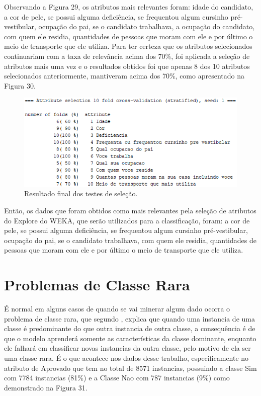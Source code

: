 \par
Observando a Figura 29,  os atributos mais relevantes foram: idade do candidato, a cor de pele, se possui alguma deficiência, se frequentou algum cursinho pré-vestibular, ocupação do pai, se o candidato trabalhava, a ocupação do candidato, com quem ele residia, quantidades de pessoas que moram com ele e por último o meio de transporte que ele utiliza. Para ter certeza que os atributos selecionados continuariam com a taxa de relevância acima dos 70\%, foi aplicada a seleção de atributos mais uma vez e o resultados obtidos foi que apenas 8 dos 10 atributos selecionados anteriormente, mantiveram acima dos 70\%, como apresentado na Figura 30.

\par
\begin{figure}[!htp]
	\begin{center}
    \caption{\label{fig:waveform_fig} Resultado final dos testes de seleção.}
	\includegraphics[scale=0.99]{Figuras/10_atributos.png}
	\end{center}
\end{figure}

\par
Então, os dados que foram obtidos como mais relevantes pela seleção de atributos do Explore do WEKA, que serão utilizados para a classificação, foram: a cor de pele, se possui alguma deficiência, se frequentou algum cursinho pré-vestibular, ocupação do pai, se o candidato trabalhava, com quem ele residia, quantidades de pessoas que moram com ele e por último o meio de transporte que ele utiliza.

\section{Problemas de Classe Rara}

\par
É normal em alguns casos de quando se vai minerar algum dado ocorra o problema de classe rara, que segundo , explica que quando uma instancia de uma classe é predominante do que outra instancia de outra classe, a consequência é de que o modelo aprenderá somente as características da classe dominante, enquanto ele falhará em classificar novas instancias da outra classe, pelo motivo de ela ser uma classe rara. É o que acontece nos dados desse trabalho, especificamente no atributo de Aprovado que tem no total de 8571 instancias, possuindo a classe Sim com 7784 instancias (81\%) e a Classe Nao com 787 instancias (9\%) como demonstrado na Figura 31.

